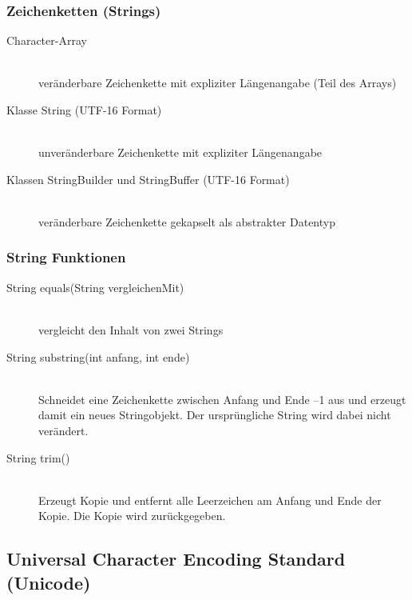 \documentclass[a4paper,10pt]{article}
\begin{document}
\subsubsection{Zeichenketten (Strings)}
\begin{description}
	\item[Character-Array] \hfill \\
		ver\"anderbare Zeichenkette mit expliziter L\"angenangabe (Teil des Arrays)
	\item[Klasse String (UTF-16 Format)] \hfill \\
		unver\"anderbare Zeichenkette mit expliziter L\"angenangabe
	\item[Klassen StringBuilder und StringBuffer (UTF-16 Format)] \hfill \\
		ver\"anderbare Zeichenkette gekapselt als abstrakter Datentyp
\end{description}

\subsubsection{String Funktionen}
\begin{description}
	\item[String equals(String vergleichenMit)] \hfill \\
		vergleicht den Inhalt von zwei Strings
	\item[String substring(int anfang, int ende)] \hfill \\
		Schneidet eine Zeichenkette zwischen Anfang und Ende –1 aus und erzeugt damit ein neues Stringobjekt. Der urspr\"ungliche String wird dabei nicht ver\"andert.
	\item[String trim()] \hfill \\
		Erzeugt Kopie und entfernt alle Leerzeichen am Anfang und Ende der Kopie. Die Kopie wird zur\"uckgegeben.
\end{description}

\subsection{Universal Character Encoding Standard (Unicode)}
\end{document}
